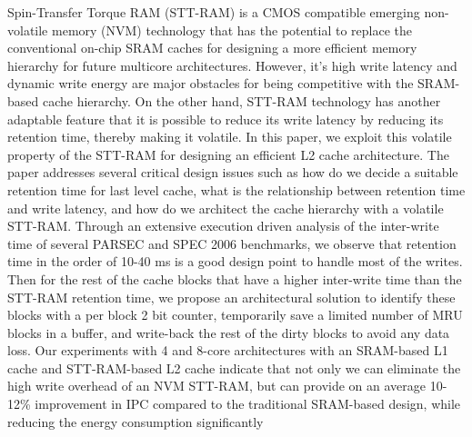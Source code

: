 
Spin-Transfer Torque RAM (STT-RAM) is a CMOS compatible emerging non-volatile memory (NVM)
technology that has the potential to replace the conventional
on-chip SRAM caches for designing a more efficient memory hierarchy for
future multicore architectures.
However, it's high write latency and dynamic
write energy are major obstacles for being competitive with the SRAM-based cache hierarchy.
On the other hand, STT-RAM technology has another adaptable feature that it is possible to reduce its write
latency by reducing its retention time, thereby making it volatile.
In this paper, we exploit this volatile property of the STT-RAM for designing an efficient L2 cache
architecture. The paper addresses several critical design issues such as how do we decide a suitable retention time for last level cache,
what is the relationship between retention time and write latency,
and how do we architect the cache hierarchy with a volatile STT-RAM.
Through an extensive execution driven analysis of the inter-write time of several PARSEC and SPEC 2006 benchmarks, we
observe that retention time in the order of 10-40 ms is a good design point to handle most of the
writes.  Then for the rest of the cache blocks that have a higher inter-write
time than the STT-RAM retention time, we propose an architectural solution to identify these blocks
with a per block 2 bit counter, temporarily save a limited number of MRU blocks in a buffer,
and write-back the rest of the dirty blocks to avoid any data loss.
Our experiments with 4 and 8-core architectures with an SRAM-based L1 cache and STT-RAM-based L2 cache
indicate that not only we can eliminate the high write overhead of an NVM STT-RAM, but can provide
on an average 10-12\% improvement in IPC compared to the traditional SRAM-based
design, while reducing the energy consumption significantly

